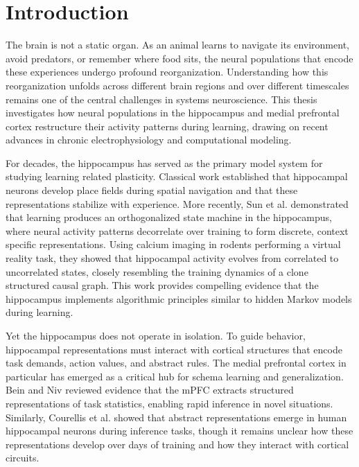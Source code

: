 \chapter{Introduction}
\label{ch:Introduction}

The brain is not a static organ. As an animal learns to navigate its environment, avoid predators, or remember where food sits, the neural populations that encode these experiences undergo profound reorganization. Understanding how this reorganization unfolds across different brain regions and over different timescales remains one of the central challenges in systems neuroscience. This thesis investigates how neural populations in the hippocampus and medial prefrontal cortex restructure their activity patterns during learning, drawing on recent advances in chronic electrophysiology and computational modeling.

For decades, the hippocampus has served as the primary model system for studying learning related plasticity. Classical work established that hippocampal neurons develop place fields during spatial navigation and that these representations stabilize with experience. More recently, Sun et al. \cite{sun2025learning} demonstrated that learning produces an orthogonalized state machine in the hippocampus, where neural activity patterns decorrelate over training to form discrete, context specific representations. Using calcium imaging in rodents performing a virtual reality task, they showed that hippocampal activity evolves from correlated to uncorrelated states, closely resembling the training dynamics of a clone structured causal graph. This work provides compelling evidence that the hippocampus implements algorithmic principles similar to hidden Markov models during learning.

Yet the hippocampus does not operate in isolation. To guide behavior, hippocampal representations must interact with cortical structures that encode task demands, action values, and abstract rules. The medial prefrontal cortex in particular has emerged as a critical hub for schema learning and generalization. Bein and Niv \cite{bein2025schemas} reviewed evidence that the mPFC extracts structured representations of task statistics, enabling rapid inference in novel situations. Similarly, Courellis et al. \cite{courellis2024abstract} showed that abstract representations emerge in human hippocampal neurons during inference tasks, though it remains unclear how these representations develop over days of training and how they interact with cortical circuits.

